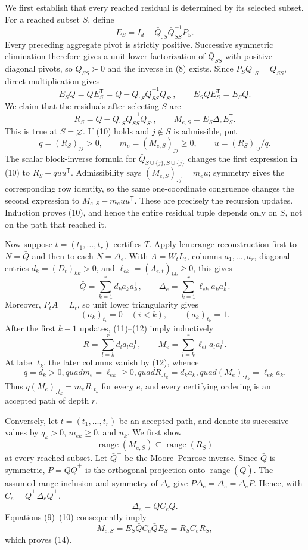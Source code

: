 We first establish that every reached residual is determined by its selected subset.  For a reached subset \(S\), define
\[
 E_S=I_d-\bar Q_{:S}\bar Q_{SS}^{-1}P_S. \tag{8}
\]
Every preceding aggregate pivot is strictly positive.  Successive symmetric elimination therefore gives a unit-lower factorization of \(\bar Q_{SS}\) with positive diagonal pivots, so \(\bar Q_{SS}\succ0\) and the inverse in (8) exists.  Since \(P_S\bar Q_{:S}=\bar Q_{SS}\), direct multiplication gives
\[
 E_S\bar Q=\bar QE_S^{\mathsf T}
 =\bar Q-\bar Q_{:S}\bar Q_{SS}^{-1}\bar Q_{S:},
 \qquad E_S\bar QE_S^{\mathsf T}=E_S\bar Q. \tag{9}
\]
We claim that the residuals after selecting \(S\) are
\[
 R_S=\bar Q-\bar Q_{:S}\bar Q_{SS}^{-1}\bar Q_{S:},
 \qquad M_{e,S}=E_S\Delta_eE_S^{\mathsf T}. \tag{10}
\]
This is true at \(S=\varnothing\).  If (10) holds and \(j\notin S\) is admissible, put
\[
 q=(R_S)_{jj}>0,\qquad m_e=(M_{e,S})_{jj}\ge0,\qquad
 u=(R_S)_{:j}/q.
\]
The scalar block-inverse formula for \(\bar Q_{S\cup\{j\},S\cup\{j\}}\) changes the first expression in (10) to \(R_S-quu^{\mathsf T}\).  Admissibility says \((M_{e,S})_{:j}=m_eu\); symmetry gives the corresponding row identity, so the same one-coordinate congruence changes the second expression to \(M_{e,S}-m_euu^{\mathsf T}\).  These are precisely the recursion updates.  Induction proves (10), and hence the entire residual tuple depends only on \(S\), not on the path that reached it.

Now suppose \(t=(t_1,\ldots,t_r)\) certifies \(T\).  Apply \(\text{lem:range-reconstruction}\) first to \(N=\bar Q\) and then to each \(N=\Delta_e\).  With \(A=W_tL_t\), columns \(a_1,\ldots,a_r\), diagonal entries \(d_k=(D_t)_{kk}>0\), and \(\ell_{ek}=(\Lambda_{e,t})_{kk}\ge0\), this gives
\[
 \bar Q=\sum_{k=1}^r d_ka_ka_k^{\mathsf T},
 \qquad
 \Delta_e=\sum_{k=1}^r\ell_{ek}a_ka_k^{\mathsf T}. \tag{11}
\]
Moreover, \(P_tA=L_t\), so unit lower triangularity gives
\[
 (a_k)_{t_i}=0\quad(i<k),\qquad (a_k)_{t_k}=1. \tag{12}
\]
After the first \(k-1\) updates, (11)--(12) imply inductively
\[
 R=\sum_{l=k}^r d_la_la_l^{\mathsf T},
 \qquad M_e=\sum_{l=k}^r\ell_{el}a_la_l^{\mathsf T}. \tag{13}
\]
At label \(t_k\), the later columns vanish by (12), whence
\[
 q=d_k>0,quad m_e=\ell_{ek}\ge0,quad
 R_{:t_k}=d_ka_k,quad (M_e)_{:t_k}=\ell_{ek}a_k.
\]
Thus \(q(M_e)_{:t_k}=m_eR_{:t_k}\) for every \(e\), and every certifying ordering is an accepted path of depth \(r\).

Conversely, let \(t=(t_1,\ldots,t_r)\) be an accepted path, and denote its successive values by \(q_k>0\), \(m_{ek}\ge0\), and \(u_k\).  We first show
\[
 \operatorname{range}(M_{e,S})\subseteq\operatorname{range}(R_S) \tag{14}
\]
at every reached subset.  Let \(\bar Q^+\) be the Moore--Penrose inverse.  Since \(\bar Q\) is symmetric, \(P=\bar Q\bar Q^+\) is the orthogonal projection onto \(\operatorname{range}(\bar Q)\).  The assumed range inclusion and symmetry of \(\Delta_e\) give \(P\Delta_e=\Delta_e=\Delta_eP\).  Hence, with \(C_e=\bar Q^+\Delta_e\bar Q^+\),
\[
 \Delta_e=\bar QC_e\bar Q.
\]
Equations (9)--(10) consequently imply
\[
 M_{e,S}=E_S\bar QC_e\bar QE_S^{\mathsf T}=R_SC_eR_S,
\]
which proves (14).


